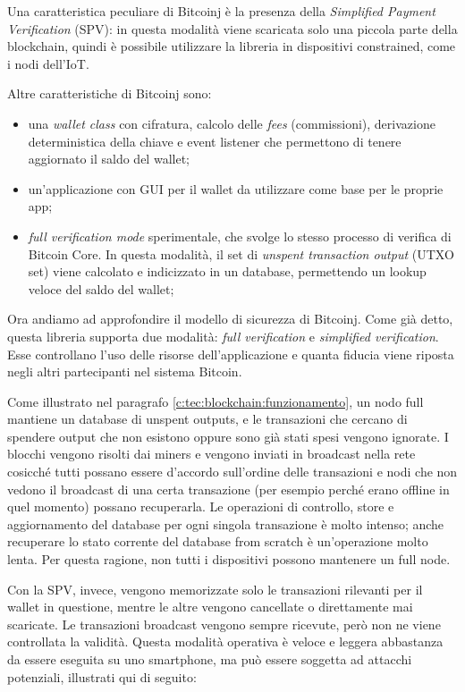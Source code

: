 Una caratteristica peculiare di Bitcoinj è la presenza della \textit{Simplified Payment Verification} (SPV): in questa modalità viene scaricata solo una piccola parte della blockchain, quindi è possibile utilizzare la libreria in dispositivi constrained, come i nodi dell'IoT. 

Altre caratteristiche di Bitcoinj sono: 
\begin{itemize}
    \item una \textit{wallet class} con cifratura, calcolo delle \textit{fees} (commissioni), derivazione deterministica della chiave e event listener che permettono di tenere aggiornato il saldo del wallet;
    \item un'applicazione con GUI per il wallet da utilizzare come base per le proprie app;
    \item \textit{full verification mode} sperimentale, che svolge lo stesso processo di verifica di Bitcoin Core. In questa modalità, il set di \textit{unspent transaction output} (UTXO set) viene calcolato e indicizzato in un database, permettendo un lookup veloce del saldo del wallet;
\end{itemize}

Ora andiamo ad approfondire il modello di sicurezza di Bitcoinj. Come gi\`a detto, questa libreria supporta due modalità: \textit{full verification} e \textit{simplified verification}. Esse controllano l'uso delle risorse dell'applicazione e quanta fiducia viene riposta negli altri partecipanti nel sistema Bitcoin. 

Come illustrato nel paragrafo \ref{c:tec:blockchain:funzionamento}, un nodo full mantiene un database di unspent outputs, e le transazioni che cercano di spendere output che non esistono oppure sono già stati spesi vengono ignorate. I blocchi vengono risolti dai miners e vengono inviati in broadcast nella rete cosicché tutti possano essere d'accordo sull'ordine delle transazioni e nodi che non vedono il broadcast di una certa transazione (per esempio perché erano offline in quel momento) possano recuperarla. 
Le operazioni di controllo, store e aggiornamento del database per ogni singola transazione è molto intenso; anche recuperare lo stato corrente del database from scratch è un'operazione molto lenta. Per questa ragione, non tutti i dispositivi possono mantenere un full node.

Con la SPV, invece, vengono memorizzate solo le transazioni rilevanti per il wallet in questione, mentre le altre vengono cancellate o direttamente mai scaricate. Le transazioni broadcast vengono sempre ricevute, però non ne viene controllata la validità. Questa modalità operativa è veloce e leggera abbastanza da essere eseguita su uno smartphone, ma può essere soggetta ad attacchi potenziali, illustrati qui di seguito: 

